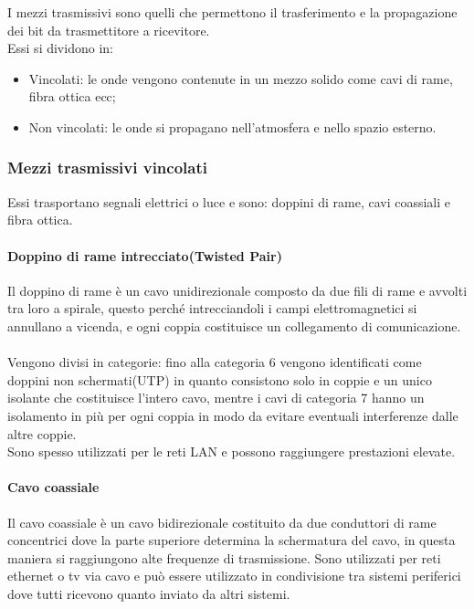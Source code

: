 \documentclass{subfiles}
\begin{document}
    I mezzi trasmissivi sono quelli che permettono il trasferimento e la propagazione dei bit da trasmettitore a ricevitore.\\
    Essi si dividono in:
    \begin{itemize}
        \item Vincolati: le onde vengono contenute in un mezzo solido come cavi di rame, fibra ottica ecc;
        \item Non vincolati: le onde si propagano nell'atmosfera e nello spazio esterno.
    \end{itemize}

\subsubsection{Mezzi trasmissivi vincolati}
    Essi trasportano segnali elettrici o luce e sono: doppini di rame, cavi coassiali e fibra ottica.

    \paragraph{Doppino di rame intrecciato(Twisted Pair)}
    Il doppino di rame è un cavo unidirezionale composto da due fili di rame e avvolti tra loro a spirale, questo perché intrecciandoli 
    i campi elettromagnetici si annullano a vicenda, e ogni coppia costituisce un collegamento di comunicazione.\\ \\
    Vengono divisi in categorie: fino alla categoria 6 vengono identificati come doppini non schermati(UTP) in quanto consistono solo in coppie e 
    un unico isolante che costituisce l'intero cavo, mentre i cavi di categoria 7 hanno un isolamento in più per ogni coppia in modo da 
    evitare eventuali interferenze dalle altre coppie.\\
    Sono spesso utilizzati per le reti LAN e possono raggiungere prestazioni elevate.

    \paragraph{Cavo coassiale}
    Il cavo coassiale è un cavo bidirezionale costituito da due conduttori di rame concentrici dove la parte superiore determina la 
    schermatura del cavo, in questa maniera si raggiungono alte frequenze di trasmissione. Sono utilizzati per reti ethernet o tv via 
    cavo e può essere utilizzato in condivisione tra sistemi periferici dove tutti ricevono quanto inviato da altri sistemi.
\end{document}
